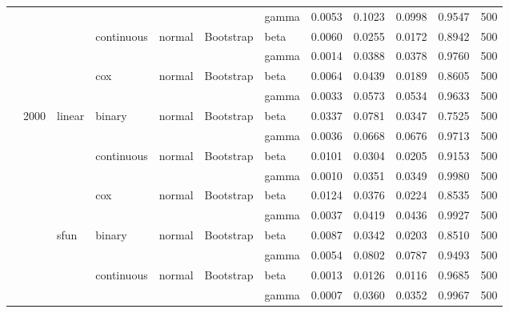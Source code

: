 \begin{tabular}{lllllllrrrrr}
 &  &  &  &  &  & gamma & 0.0053 & 0.1023 & 0.0998 & 0.9547 & 500 \\
\cline{4-12} \cline{5-12} \cline{6-12}
 &  &  & \multirow[t]{2}{*}{continuous} & \multirow[t]{2}{*}{normal} & \multirow[t]{2}{*}{Bootstrap} & beta & 0.0060 & 0.0255 & 0.0172 & 0.8942 & 500 \\
 &  &  &  &  &  & gamma & 0.0014 & 0.0388 & 0.0378 & 0.9760 & 500 \\
\cline{4-12} \cline{5-12} \cline{6-12}
 &  &  & \multirow[t]{2}{*}{cox} & \multirow[t]{2}{*}{normal} & \multirow[t]{2}{*}{Bootstrap} & beta & 0.0064 & 0.0439 & 0.0189 & 0.8605 & 500 \\
 &  &  &  &  &  & gamma & 0.0033 & 0.0573 & 0.0534 & 0.9633 & 500 \\
\cline{2-12} \cline{3-12} \cline{4-12} \cline{5-12} \cline{6-12}
 & \multirow[t]{18}{*}{2000} & \multirow[t]{6}{*}{linear} & \multirow[t]{2}{*}{binary} & \multirow[t]{2}{*}{normal} & \multirow[t]{2}{*}{Bootstrap} & beta & 0.0337 & 0.0781 & 0.0347 & 0.7525 & 500 \\
 &  &  &  &  &  & gamma & 0.0036 & 0.0668 & 0.0676 & 0.9713 & 500 \\
\cline{4-12} \cline{5-12} \cline{6-12}
 &  &  & \multirow[t]{2}{*}{continuous} & \multirow[t]{2}{*}{normal} & \multirow[t]{2}{*}{Bootstrap} & beta & 0.0101 & 0.0304 & 0.0205 & 0.9153 & 500 \\
 &  &  &  &  &  & gamma & 0.0010 & 0.0351 & 0.0349 & 0.9980 & 500 \\
\cline{4-12} \cline{5-12} \cline{6-12}
 &  &  & \multirow[t]{2}{*}{cox} & \multirow[t]{2}{*}{normal} & \multirow[t]{2}{*}{Bootstrap} & beta & 0.0124 & 0.0376 & 0.0224 & 0.8535 & 500 \\
 &  &  &  &  &  & gamma & 0.0037 & 0.0419 & 0.0436 & 0.9927 & 500 \\
\cline{3-12} \cline{4-12} \cline{5-12} \cline{6-12}
 &  & \multirow[t]{6}{*}{sfun} & \multirow[t]{2}{*}{binary} & \multirow[t]{2}{*}{normal} & \multirow[t]{2}{*}{Bootstrap} & beta & 0.0087 & 0.0342 & 0.0203 & 0.8510 & 500 \\
 &  &  &  &  &  & gamma & 0.0054 & 0.0802 & 0.0787 & 0.9493 & 500 \\
\cline{4-12} \cline{5-12} \cline{6-12}
 &  &  & \multirow[t]{2}{*}{continuous} & \multirow[t]{2}{*}{normal} & \multirow[t]{2}{*}{Bootstrap} & beta & 0.0013 & 0.0126 & 0.0116 & 0.9685 & 500 \\
 &  &  &  &  &  & gamma & 0.0007 & 0.0360 & 0.0352 & 0.9967 & 500 \\
\cline{4-12} \cline{5-12} \cline{6-12}

\end{tabular}
